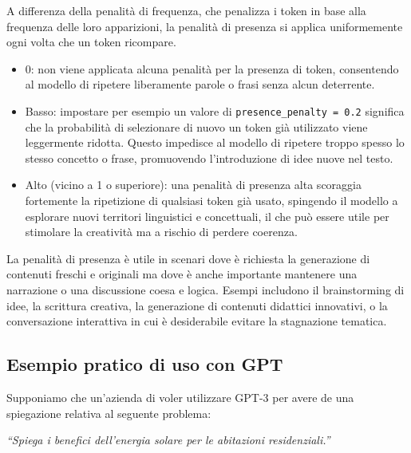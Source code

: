             A differenza della penalità di frequenza, che penalizza i token in base alla frequenza delle loro apparizioni, la penalità di presenza si applica uniformemente ogni volta che un token ricompare.
            \begin{itemize}
                \item 0: non viene applicata alcuna penalità per la presenza di token, consentendo al modello di ripetere liberamente parole o frasi senza alcun deterrente.
            
                \item Basso: impostare per esempio un valore di \texttt{presence\_penalty = 0.2} significa che la probabilità di selezionare di nuovo un token già utilizzato viene leggermente ridotta. Questo impedisce al modello di ripetere troppo spesso lo stesso concetto o frase, promuovendo l'introduzione di idee nuove nel testo.
            
                \item Alto (vicino a 1 o superiore): una penalità di presenza alta scoraggia fortemente la ripetizione di qualsiasi token già usato, spingendo il modello a esplorare nuovi territori linguistici e concettuali, il che può essere utile per stimolare la creatività ma a rischio di perdere coerenza.
            \end{itemize}
            
            La penalità di presenza è utile in scenari dove è richiesta la generazione di contenuti freschi e originali ma dove è anche importante mantenere una narrazione o una discussione coesa e logica. Esempi includono il brainstorming di idee, la scrittura creativa, la generazione di contenuti didattici innovativi, o la conversazione interattiva in cui è desiderabile evitare la stagnazione tematica.
            
    \subsection{Esempio pratico di uso con GPT}
        Supponiamo che un'azienda di voler utilizzare GPT-3 per avere de una spiegazione relativa al seguente problema:

        \begin{center}
            \textit{``Spiega i benefici dell'energia solare per le abitazioni residenziali.''}
        \end{center}

